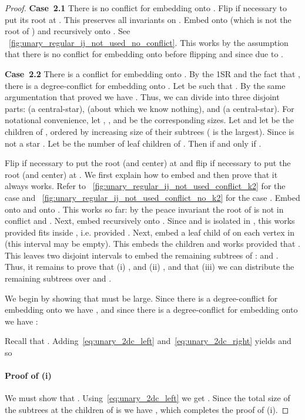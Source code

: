 \documentclass[11pt,a4paper,colorlinks=true,urlcolor=blue,citecolor=red]{article}
\theoremstyle{plain}
\newcommand{\subsubparagraph}[1]{\paragraph{#1}}
\newcommand{\case}[1]{\par\vspace{.5\baselineskip}\noindent\textbf{\sffamily Case~#1}}
\begin{document}
\begin{proof}
  \case{2.1} There is no conflict for embedding  onto .
  Flip  if necessary to put its root at . This preserves
  all invariants on . Embed  onto  (which is not the root
  of ) and  recursively onto . See
  \figurename~\ref{fig:unary_regular_ij_not_used_no_conflict}. This
  works by the assumption that there is no conflict for embedding
   onto  before flipping  and since
   due to .

  \case{2.2} There is a conflict for embedding  onto .  By
  the 1SR and the fact that , there is a
  degree-conflict for embedding  onto . Let  be such that
  . By the same argumentation that proved
   we have . Thus, we can divide
   into three disjoint parts:  (a central-star),
   (about which we know nothing), and  (a
  central-star). For notational convenience, let ,
  , and  be the corresponding sizes. Let
   and let  be the children of , ordered
  by increasing size of their subtrees ( is the largest).
  Since  is not a star . Let  be the
  number of leaf children of . Then  if and only if
  .

  Flip  if necessary to put the root (and center) at  and
  flip  if necessary to put the root (and center) at . We
  first explain how to embed  and then prove that it always works.
  Refer to \figurename~\ref{fig:unary_regular_ij_not_used_conflict_k2}
  for the case  and
  \figurename~\ref{fig:unary_regular_ij_not_used_conflict_no_k2} for the
  case . Embed  onto  and  onto . This works so far:
  by the peace invariant the root of  is not
  in conflict and . Next, embed 
  recursively onto . Since
   and  is isolated in
  , this works provided  fits inside
  , i.e. provided .
  Next, embed a leaf child of  on each vertex in  (this
  interval may be empty). This embeds the children 
  and works provided that . This leaves two disjoint
  intervals to embed the remaining subtrees
   of :
   and . Thus, it
  remains to prove that (i) , and (ii) , and that (iii) we can distribute the remaining subtrees over
   and .

  We begin by showing that  must be large. Since there is a
  degree-conflict for embedding  onto  we have
  , and since there is a degree-conflict for embedding 
  onto  we have :

Recall that . Adding~\eqref{eq:unary_2dc_left}
  and~\eqref{eq:unary_2dc_right} yields  and so

\subsubparagraph{Proof of (i)} We must show that .
  Using~\eqref{eq:unary_2dc_left} we get
  . Since the
  total size of the subtrees at the children of  is  we have
  ,
  which completes the proof of (i). 


\end{proof}
\end{document}
